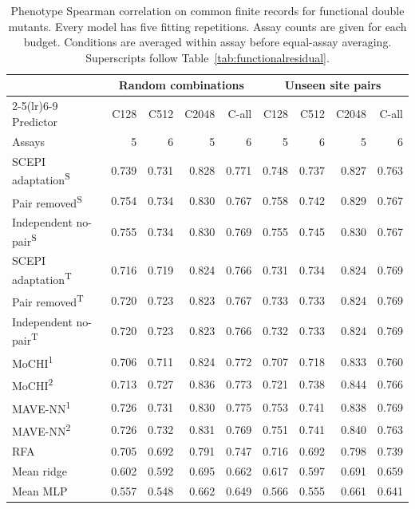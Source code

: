 \documentclass{llncs}
\begin{document}
\begin{table}[H]
\centering
\setlength{\tabcolsep}{3.5pt}
\caption{Phenotype Spearman correlation on common finite records for functional double mutants. Every model has five fitting repetitions. Assay counts are given for each budget. Conditions are averaged within assay before equal-assay averaging. Superscripts follow Table~\ref{tab:functionalresidual}.}
\label{tab:functionalrank}
\begin{tabular}{lrrrrrrrr}
\toprule
 & \multicolumn{4}{c}{Random combinations} & \multicolumn{4}{c}{Unseen site pairs} \\
\cmidrule(lr){2-5}\cmidrule(lr){6-9}
Predictor & C128 & C512 & C2048 & C-all & C128 & C512 & C2048 & C-all \\
\midrule
Assays & 5 & 6 & 5 & 6 & 5 & 6 & 5 & 6 \\
\midrule
SCEPI adaptation\textsuperscript{S} & 0.739 & 0.731 & 0.828 & 0.771 & 0.748 & 0.737 & 0.827 & 0.763 \\
Pair removed\textsuperscript{S} & 0.754 & 0.734 & 0.830 & 0.767 & 0.758 & 0.742 & 0.829 & 0.767 \\
Independent no-pair\textsuperscript{S} & 0.755 & 0.734 & 0.830 & 0.769 & 0.755 & 0.745 & 0.830 & 0.767 \\
SCEPI adaptation\textsuperscript{T} & 0.716 & 0.719 & 0.824 & 0.766 & 0.731 & 0.734 & 0.824 & 0.769 \\
Pair removed\textsuperscript{T} & 0.720 & 0.723 & 0.823 & 0.767 & 0.733 & 0.733 & 0.824 & 0.769 \\
Independent no-pair\textsuperscript{T} & 0.720 & 0.723 & 0.823 & 0.766 & 0.732 & 0.733 & 0.824 & 0.769 \\
MoCHI\textsuperscript{1} & 0.706 & 0.711 & 0.824 & 0.772 & 0.707 & 0.718 & 0.833 & 0.760 \\
MoCHI\textsuperscript{2} & 0.713 & 0.727 & 0.836 & 0.773 & 0.721 & 0.738 & 0.844 & 0.766 \\
MAVE-NN\textsuperscript{1} & 0.726 & 0.731 & 0.830 & 0.775 & 0.753 & 0.741 & 0.838 & 0.769 \\
MAVE-NN\textsuperscript{2} & 0.726 & 0.732 & 0.831 & 0.769 & 0.751 & 0.741 & 0.840 & 0.763 \\
RFA & 0.705 & 0.692 & 0.791 & 0.747 & 0.716 & 0.692 & 0.798 & 0.739 \\
Mean ridge & 0.602 & 0.592 & 0.695 & 0.662 & 0.617 & 0.597 & 0.691 & 0.659 \\
Mean MLP & 0.557 & 0.548 & 0.662 & 0.649 & 0.566 & 0.555 & 0.661 & 0.641 \\
\bottomrule
\end{tabular}
\end{table}
\end{document}
